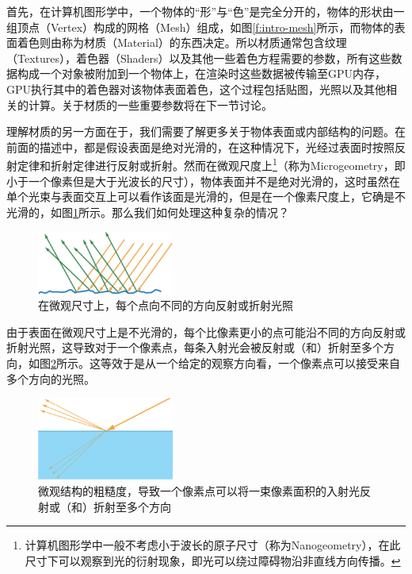 首先，在计算机图形学中，一个物体的“形”与“色”是完全分开的，物体的形状由一组顶点（Vertex）构成的网格（Mesh）组成，如图\ref{f:intro-mesh}所示，而物体的表面着色则由称为材质（Material）的东西决定。所以材质通常包含纹理（Textures），着色器（Shaders）以及其他一些着色方程需要的参数，所有这些数据构成一个对象被附加到一个物体上，在渲染时这些数据被传输至GPU内存，GPU执行其中的着色器对该物体表面着色，这个过程包括贴图，光照以及其他相关的计算。关于材质的一些重要参数将在下一节讨论。

理解材质的另一方面在于，我们需要了解更多关于物体表面或内部结构的问题。在前面的描述中，都是假设表面是绝对光滑的，在这种情况下，光经过表面时按照反射定律和折射定律进行反射或折射。然而在微观尺度上\footnote{计算机图形学中一般不考虑小于波长的原子尺寸（称为Nanogeometry），在此尺寸下可以观察到光的衍射现象，即光可以绕过障碍物沿非直线方向传播。}（称为Microgeometry，即小于一个像素但是大于光波长的尺寸），物体表面并不是绝对光滑的，这时虽然在单个光束与表面交互上可以看作该面是光滑的，但是在一个像素尺度上，它确是不光滑的，如图\ref{f:intro-microgeometry-1}所示。那么我们如何处理这种复杂的情况？

\begin{figure}
\sidecaption
	\includegraphics[width=0.4\textwidth]{figures/intro/ray-optics-3}
	\caption{在微观尺寸上，每个点向不同的方向反射或折射光照}
	\label{f:intro-microgeometry-1}
\end{figure}

由于表面在微观尺寸上是不光滑的，每个比像素更小的点可能沿不同的方向反射或折射光照，这导致对于一个像素点，每条入射光会被反射或（和）折射至多个方向，如图\ref{f:intro-multi-rays}所示。这等效于是从一个给定的观察方向看，一个像素点可以接受来自多个方向的光照。

\begin{figure}
\sidecaption
	\includegraphics[width=0.4\textwidth]{figures/intro/ray-optics-4}
	\caption{微观结构的粗糙度，导致一个像素点可以将一束像素面积的入射光反射或（和）折射至多个方向}
	\label{f:intro-multi-rays}
\end{figure}

